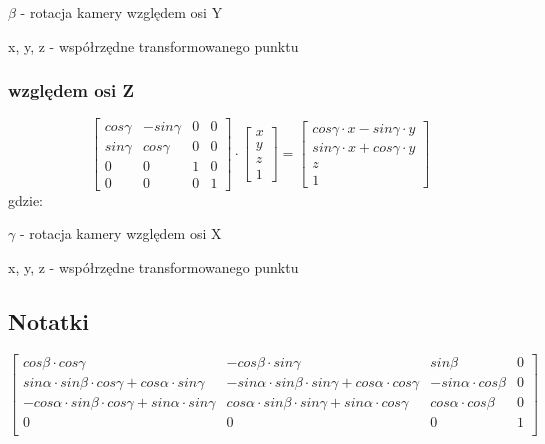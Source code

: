 \documentclass[11pt]{article}
\begin{document}
$\beta$ - rotacja kamery względem osi Y

x, y, z - współrzędne transformowanego punktu

\subsubsection{względem osi Z}
\begin{equation}
    \begin{bmatrix}
        cos \gamma & -sin \gamma & 0 & 0\\
        sin \gamma & cos \gamma & 0 & 0\\
        0 & 0 & 1 & 0\\
        0 & 0 & 0 & 1
    \end{bmatrix}
    \cdot
    \begin{bmatrix}
        x\\
        y\\
        z\\
        1
    \end{bmatrix}
    =
    \begin{bmatrix}
        cos \gamma \cdot x - sin \gamma \cdot y\\
        sin \gamma \cdot x + cos \gamma \cdot y\\
        z\\
        1
    \end{bmatrix}
\end{equation}
gdzie:

$\gamma$ - rotacja kamery względem osi X

x, y, z - współrzędne transformowanego punktu
\subsection{Notatki}
\begin{equation}
    \begin{bmatrix}
        cos \beta \cdot cos \gamma & -cos \beta \cdot sin \gamma & sin \beta & 0\\
        sin \alpha \cdot sin \beta \cdot cos \gamma + cos \alpha \cdot sin\gamma& -sin \alpha \cdot sin \beta \cdot sin \gamma + cos \alpha \cdot cos \gamma & -sin \alpha \cdot cos \beta & 0\\
        -cos \alpha \cdot sin \beta \cdot cos \gamma + sin \alpha \cdot sin \gamma & cos \alpha \cdot sin \beta \cdot sin \gamma + sin \alpha \cdot cos \gamma & cos \alpha \cdot cos \beta & 0\\
        0 & 0 & 0 & 1\\
    \end{bmatrix}
\end{equation}
\end{document}
